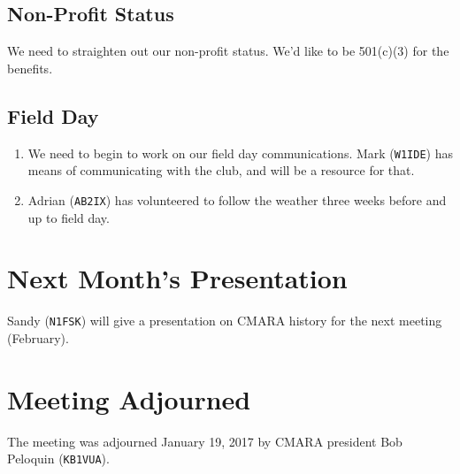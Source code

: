 \documentclass[10pt,letterpaper]{article}
\begin{document}
\subsection{Non-Profit Status}
We need to straighten out our non-profit status. We'd like to be 501(c)(3) for the benefits.

\subsection{Field Day}
\begin{enumerate}
  \item We need to begin to work on our field day communications. Mark (\texttt{W1IDE}) has means of communicating with the club, and will be a resource for that.
  \item Adrian (\texttt{AB2IX}) has volunteered to follow the weather three weeks before and up to field day.
\end{enumerate}

\section{Next Month's Presentation}
Sandy (\texttt{N1FSK}) will give a presentation on CMARA history for the next meeting (February).

\section{Meeting Adjourned}
The meeting was adjourned January 19, 2017 by CMARA president Bob Peloquin (\texttt{KB1VUA}).
\end{document}
